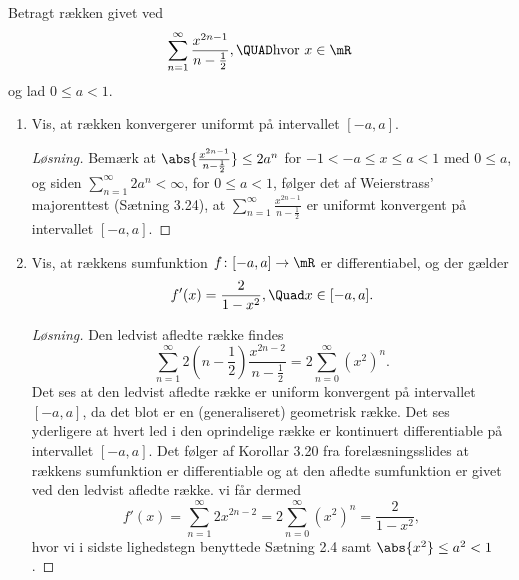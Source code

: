 \begin{opg}
	Betragt rækken givet ved
	$$ \sum_{n=1}^\infty \frac{x^{2n-1}}{n-\frac12}, \QUAD\text{hvor } x\in\mR $$
	og lad $0\leq a < 1$. 
	\begin{enumerate}
		\item Vis, at rækken konvergerer uniformt på intervallet $[-a,a]$.
		\ifanswers
		\begin{proof}[Løsning]
			Bemærk at $ \abs{\frac{x^{2n-1}}{n-\frac{1}{2}}}\leq 2a^n $ for $ -1<-a\leq x\leq a<1 $ med $ 0\leq a $, og siden $ \sum_{n=1}^{\infty}2a^n<\infty $, for $ 0\leq a<1 $, følger det af Weierstrass' majorenttest (Sætning 3.24), at $ \sum_{n=1}^\infty \frac{x^{2n-1}}{n-\frac12} $ er uniformt konvergent på intervallet $ [-a,a] $.
		\end{proof}
		\fi
		
		\item Vis, at rækkens sumfunktion $f\colon [-a,a]\to\mR$ er differentiabel, og der gælder
		$$ f'(x)=\frac{2}{1-x^2}, \Quad x\in[-a,a]. $$
		\ifanswers
		\begin{proof}[Løsning]
			Den ledvist afledte række findes\begin{equation*}
			\sum_{n=1}^{\infty}2\left(n-\frac{1}{2}\right)\frac{x^{2n-2}}{n-\frac12}=2\sum_{n=0}^{\infty}(x^2)^n.
			\end{equation*}
			Det ses at den ledvist afledte række er uniform konvergent på intervallet $ [-a,a] $, da det blot er en (generaliseret) geometrisk række. Det ses yderligere at hvert led i den oprindelige række er kontinuert differentiable på intervallet $ [-a,a] $.
			Det følger af Korollar 3.20 fra forelæsningsslides at rækkens sumfunktion er differentiable og at den afledte sumfunktion er givet ved den ledvist afledte række. vi får dermed \begin{equation*}
			f'(x)=\sum_{n=1}^{\infty}2x^{2n-2}=2\sum_{n=0}^{\infty}(x^2)^n=\frac{2}{1-x^2},
			\end{equation*}
			hvor vi i sidste lighedstegn benyttede Sætning 2.4 samt $ \abs{x^2}\leq a^2<1 $.
		\end{proof}
		\fi
		

\end{enumerate}
\end{opg}
